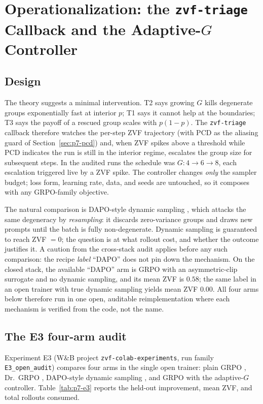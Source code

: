 \section{Operationalization: the \texttt{zvf-triage} Callback and the
Adaptive-$G$ Controller}
\label{sec:p7-controller}
\label{sec:p7-controller-family}

\subsection{Design}
\label{sec:p7-controller-design}
The theory suggests a minimal intervention. T2 says growing $G$ kills
degenerate groups exponentially fast at interior $p$; T1 says it cannot help
at the boundaries; T3 says the payoff of a rescued group scales with
$p(1-p)$. The \texttt{zvf-triage} callback therefore watches the per-step
ZVF trajectory (with PCD as the aliasing guard of
Section~\ref{sec:p7-pcd}) and, when ZVF spikes above a threshold while PCD
indicates the run is still in the interior regime, escalates the group size
for subsequent steps. In the audited runs the schedule was $G: 4 \to 6 \to
8$, each escalation triggered live by a ZVF spike. The controller changes
\emph{only} the sampler budget; loss form, learning rate, data, and seeds
are untouched, so it composes with any GRPO-family objective.

The natural comparison is DAPO-style dynamic sampling \citep{yu2025dapo},
which attacks the same degeneracy by \emph{resampling}: it discards
zero-variance groups and draws new prompts until the batch is fully
non-degenerate. Dynamic sampling is guaranteed to reach ZVF $= 0$; the
question is at what rollout cost, and whether the outcome justifies it.
A caution from the cross-stack audit applies before any such comparison:
the recipe \emph{label} ``DAPO'' does not pin down the mechanism. On the
closed stack, the available ``DAPO'' arm is GRPO with an asymmetric-clip
surrogate and no dynamic sampling, and its mean ZVF is $0.58$; the same
label in an open trainer with true dynamic sampling yields mean ZVF
$0.00$. All four arms below therefore run in one open, auditable
reimplementation where each mechanism is verified from the code, not the
name.

\subsection{The E3 four-arm audit}
\label{sec:p7-e3}
Experiment E3 (W\&B project \texttt{zvf-colab-experiments}, run family
\texttt{E3\_open\_audit}) compares four arms in the single open trainer:
plain GRPO \citep{shao2024deepseekmath}, Dr.~GRPO \citep{tong2025drgrpo},
DAPO-style dynamic sampling \citep{yu2025dapo}, and GRPO with the
adaptive-$G$ controller. Table~\ref{tab:p7-e3} reports the held-out
improvement, mean ZVF, and total rollouts consumed.

